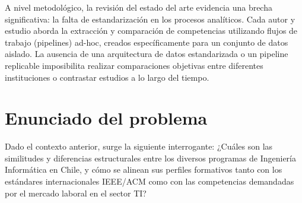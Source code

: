   A nivel metodológico, la revisión del estado del arte evidencia una brecha significativa: la falta de estandarización en los procesos analíticos. Cada autor y estudio aborda la extracción y
  comparación de competencias utilizando flujos de trabajo (pipelines) ad-hoc, creados específicamente para un conjunto de datos aislado. La ausencia de una arquitectura de datos estandarizada o un pipeline replicable imposibilita realizar comparaciones objetivas entre diferentes instituciones o contrastar estudios a lo largo del tiempo. 







\section{Enunciado del problema}
\label{cap:enunciado}
Dado el contexto anterior, surge la siguiente interrogante: ¿Cuáles son las similitudes y diferencias estructurales entre los diversos programas de Ingeniería         
Informática en Chile, y cómo se alinean sus perfiles formativos tanto con los estándares internacionales IEEE/ACM como con las competencias demandadas por el mercado laboral en el
sector TI? 
